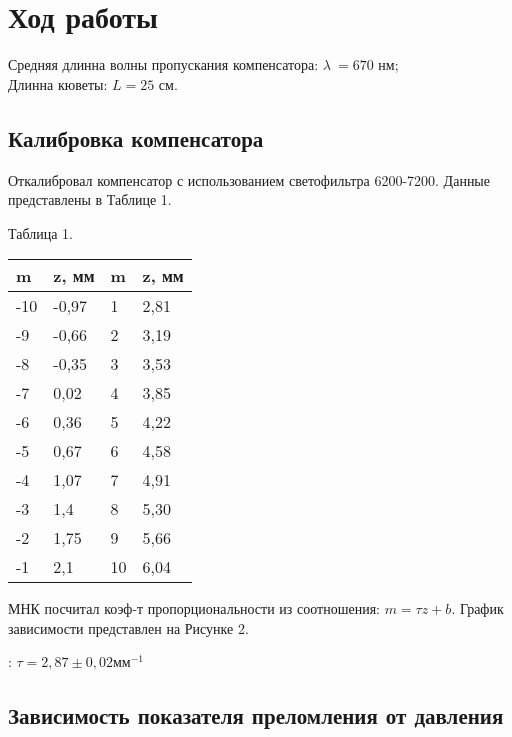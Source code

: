 

\section{Ход работы}

Средняя длинна волны пропускания компенсатора: $ \lambda\ = 670 $ нм; \\
Длинна кюветы: $ L = 25 $ см.

\subsection{Калибровка компенсатора}

Откалибровал компенсатор с использованием светофильтра 6200-7200. Данные представлены
в Таблице 1.

\begin{table}[h!]
    \begin{center}
    Таблица 1. \\
    \begin{tabular}{|l|l|l|l|}
    \hline
    m   & z, мм & m  & z, мм \\ \hline
    -10 & -0,97 & 1  & 2,81  \\ \hline
    -9  & -0,66 & 2  & 3,19  \\ \hline
    -8  & -0,35 & 3  & 3,53  \\ \hline
    -7  & 0,02  & 4  & 3,85  \\ \hline
    -6  & 0,36  & 5  & 4,22  \\ \hline
    -5  & 0,67  & 6  & 4,58  \\ \hline
    -4  & 1,07  & 7  & 4,91  \\ \hline
    -3  & 1,4   & 8  & 5,30  \\ \hline
    -2  & 1,75  & 9  & 5,66  \\ \hline
    -1  & 2,1   & 10 & 6,04  \\ \hline
    \end{tabular}
    \end{center}
\end{table}

 МНК посчитал коэф-т пропорциональности из соотношения: $ m = \tau z + b $. График
зависимости представлен на Рисунке 2.


: $ \tau = 2,87 \pm 0,02 \texttt{мм}^{-1} $

\subsection{Зависимость показателя преломления от давления}

